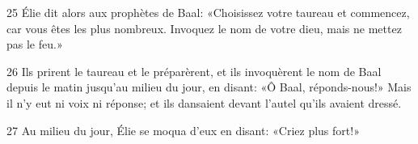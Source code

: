 
25 Élie dit alors aux prophètes de Baal: «Choisissez votre taureau et commencez, car vous êtes les plus nombreux. Invoquez le nom de votre dieu, mais ne mettez pas le feu.»

26 Ils prirent le taureau et le préparèrent, et ils invoquèrent le nom de Baal depuis le matin jusqu’au milieu du jour, en disant: «Ô Baal, réponds-nous!» Mais il n’y eut ni voix ni réponse; et ils dansaient devant l’autel qu’ils avaient dressé.

27 Au milieu du jour, Élie se moqua d’eux en disant: «Criez plus fort!»
